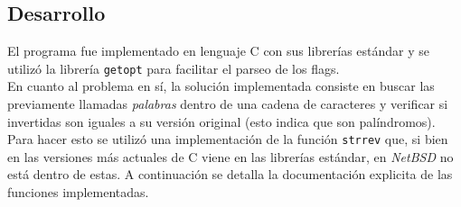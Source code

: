 \documentclass[a4paper, 10pt]{article}
\def\code#1{\texttt{#1}}
\newcommand\tab[1][0.5cm]{\hspace*{#1}}
\begin{document}
		\subsection{Desarrollo}
			El programa fue implementado en lenguaje C con sus librerías estándar y se utilizó la librería
			\code{getopt} para facilitar el parseo de los flags. \\
			\tab En cuanto al problema en sí, la solución implementada consiste en buscar las previamente
			llamadas \emph{palabras} dentro de una cadena de caracteres y verificar si invertidas son iguales
			a su versión original (esto indica que son palíndromos). Para hacer esto se utilizó una implementación
			de la función \code{strrev} que, si bien en las versiones más actuales de C viene en las librerías 
			estándar, en \emph{NetBSD} no está dentro de estas. 
			A continuación se detalla la documentación explicita de las funciones implementadas.
\end{document}
